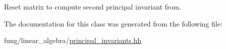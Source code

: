 \-Reset matrix to compute second principal invariant from. 



\-The documentation for this class was generated from the following file\-:\begin{DoxyCompactItemize}
\item 
fung/linear\-\_\-algebra/\hyperlink{principal__invariants_8hh}{principal\-\_\-invariants.\-hh}\end{DoxyCompactItemize}
